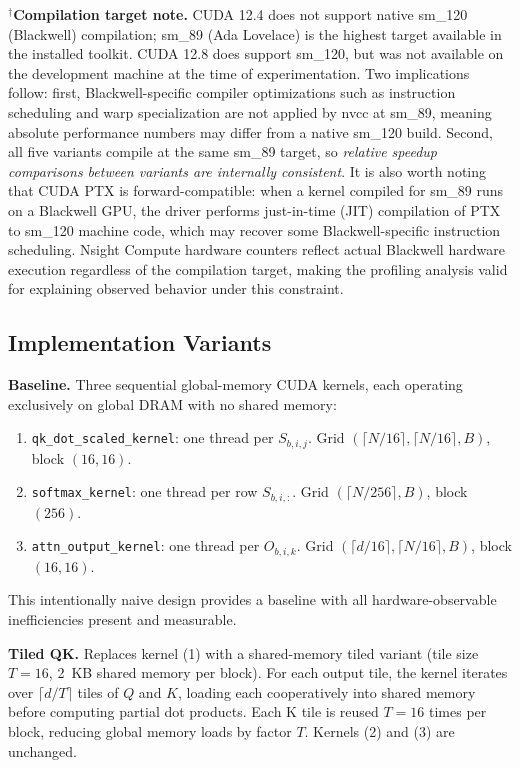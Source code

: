 \documentclass{article}
\begin{document}
$^\dagger$\textbf{Compilation target note.}
CUDA 12.4 does not support native sm\_120 (Blackwell) compilation; sm\_89
(Ada Lovelace) is the highest target available in the installed toolkit.
CUDA 12.8 does support sm\_120, but was not available on the development
machine at the time of experimentation. Two implications follow: first,
Blackwell-specific compiler optimizations such as instruction scheduling
and warp specialization are not applied by nvcc at sm\_89, meaning absolute
performance numbers may differ from a native sm\_120 build. Second, all
five variants compile at the same sm\_89 target, so \textit{relative
speedup comparisons between variants are internally consistent}. It is
also worth noting that CUDA PTX is forward-compatible: when a kernel
compiled for sm\_89 runs on a Blackwell GPU, the driver performs
just-in-time (JIT) compilation of PTX to sm\_120 machine code, which may
recover some Blackwell-specific instruction scheduling. Nsight Compute
hardware counters reflect actual Blackwell hardware execution regardless
of the compilation target, making the profiling analysis valid for
explaining observed behavior under this constraint.

\subsection{Implementation Variants}

\textbf{Baseline.} Three sequential global-memory CUDA kernels, each
operating exclusively on global DRAM with no shared memory:

\begin{enumerate}[noitemsep]
\item \texttt{qk\_dot\_scaled\_kernel}: one thread per $S_{b,i,j}$.
      Grid $(\lceil N/16\rceil,\lceil N/16\rceil,B)$, block $(16,16)$.
\item \texttt{softmax\_kernel}: one thread per row $S_{b,i,:}$.
      Grid $(\lceil N/256\rceil,B)$, block $(256)$.
\item \texttt{attn\_output\_kernel}: one thread per $O_{b,i,k}$.
      Grid $(\lceil d/16\rceil,\lceil N/16\rceil,B)$, block $(16,16)$.
\end{enumerate}

This intentionally naive design provides a baseline with all
hardware-observable inefficiencies present and measurable.

\textbf{Tiled QK.} Replaces kernel (1) with a shared-memory tiled variant
(tile size $T{=}16$, 2~KB shared memory per block). For each output tile,
the kernel iterates over $\lceil d/T\rceil$ tiles of $Q$ and $K$, loading
each cooperatively into shared memory before computing partial dot products.
Each K tile is reused $T{=}16$ times per block, reducing global memory loads
by factor $T$. Kernels (2) and (3) are unchanged.
\end{document}
